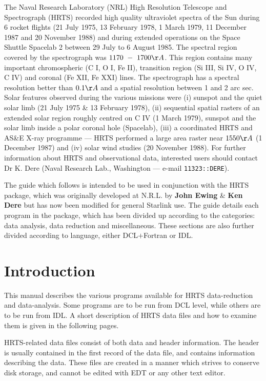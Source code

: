 The Naval Research Laboratory (NRL) High Resolution Telescope and Spectrograph
(HRTS) recorded high quality ultraviolet spectra of the Sun during 6 rocket
flights (21 July 1975, 13 February 1978, 1 March 1979, 11 December 1987
and 20 November 1988) and during extended operations on the Space
Shuttle Spacelab 2 between 29 July to 6 August 1985. The spectral region
covered by the spectrograph was $1170 \ - \ 1700\AA$. This region
contains many important chromospheric (C I, O I, Fe II), transition
region (Si III, Si IV, O IV, C IV) and coronal (Fe XII, Fe XXI) lines.
The spectrograph has a spectral resolution better than $0.1\AA$ and a
spatial resolution between 1 and 2 arc sec. Solar features observed
during the various missions were (i) sunspot and the quiet solar limb
(21 July 1975 \& 13 February 1978), (ii) sequential spatial rasters of
an extended solar region roughly centred on C IV (1 March  1979),
sunspot and the solar limb inside a polar coronal hole (Spacelab), (iii)
a coordinated HRTS and AS\&E X-ray programme --- HRTS performed a large
area raster near $1550\AA$ (1 December 1987) and (iv) solar wind studies
(20 November 1988). For further information about HRTS and observational
data, interested users should contact Dr K. Dere (Naval Research Lab.,
Washington --- e-mail {\tt 11323::DERE}).

 The guide which follows is intended to be used in conjunction with the
 HRTS package, which was originally developed at N.R.L. by {\bf John Ewing}
 \& {\bf Ken Dere} but has now been modified for general Starlink use.
 The guide details each program
 in the package, which has been divided up according to the categories:
 data analysis, data reduction and miscellaneous. These sections are also
 further divided according to language, either DCL$+$Fortran or IDL.


\newpage

\section{Introduction}

This manual describes the various programs available for HRTS data-reduction
and data-anal\-ysis.  Some programs are to be run from DCL level, while others
are to be run from IDL. A short description of HRTS data files and how to
examine them is given in the following pages.

HRTS-related data files consist of both data and header information. The header
is usually contained in the first record of the data file, and contains
information describing the data. These files are created in a manner which
strives to conserve disk storage, and cannot be edited with EDT or any other
text editor.


